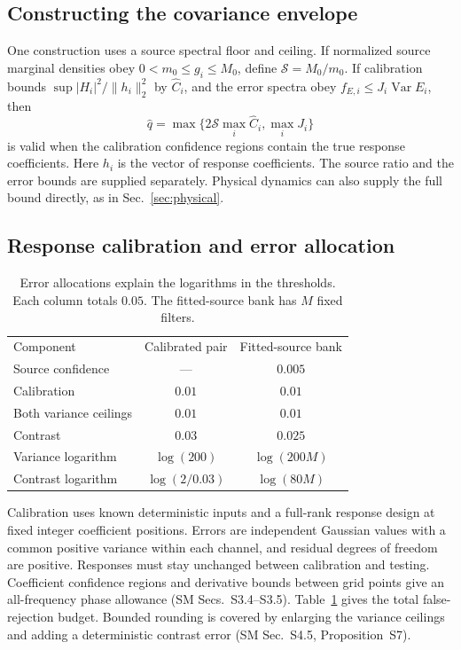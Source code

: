 \subsection{Constructing the covariance envelope}\label{sec:covariance-construction}
One construction uses a source spectral floor and ceiling. If normalized source marginal densities obey $0<m_0\le g_i\le M_0$, define $\mathcal S=M_0/m_0$. If calibration bounds $\sup|H_i|^2/\|h_i\|_2^2$ by $\widehat C_i$, and the error spectra obey $f_{E,i}\le J_i\operatorname{Var}E_i$, then
\begin{equation}
 \widehat q=\max\{2\mathcal S\max_i\widehat C_i,\max_iJ_i\}
 \label{eq:main-q}
\end{equation}
is valid when the calibration confidence regions contain the true response coefficients. Here $h_i$ is the vector of response coefficients. The source ratio and the error bounds are supplied separately. Physical dynamics can also supply the full bound directly, as in Sec.~\ref{sec:physical}.

\subsection{Response calibration and error allocation}\label{sec:calibration-details}
\begin{table}[t]
\caption{Error allocations explain the logarithms in the thresholds. Each column totals $0.05$. The fitted-source bank has $M$ fixed filters.}\label{tab:budget}
\begin{ruledtabular}\begin{tabular}{lcc}
Component & Calibrated pair & Fitted-source bank\\
Source confidence & --- & $0.005$\\
Calibration & $0.01$ & $0.01$\\
Both variance ceilings & $0.01$ & $0.01$\\
Contrast & $0.03$ & $0.025$\\\hline
Variance logarithm & $\log(200)$ & $\log(200M)$\\
Contrast logarithm & $\log(2/0.03)$ & $\log(80M)$\\
\end{tabular}\end{ruledtabular}
\end{table}

Calibration uses known deterministic inputs and a full-rank response design at fixed integer coefficient positions. Errors are independent Gaussian values with a common positive variance within each channel, and residual degrees of freedom are positive. Responses must stay unchanged between calibration and testing. Coefficient confidence regions and derivative bounds between grid points give an all-frequency phase allowance (SM Secs.~S3.4--S3.5). Table~\ref{tab:budget} gives the total false-rejection budget. Bounded rounding is covered by enlarging the variance ceilings and adding a deterministic contrast error (SM Sec.~S4.5, Proposition~S7).

